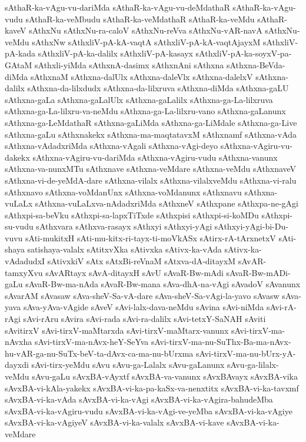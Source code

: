 {sAthaR-ka-vAgu-vu-dariMda
sAthaR-ka-vAgu-vu-deMdathaR
sAthaR-ka-vAgu-vudu
sAthaR-ka-veMbudu
sAthaR-ka-veMdathaR
sAthaR-ka-veMdu
sAthaR-kaveV
sAthxNu
sAthxNu-ra-caloV
sAthxNu-reVva
sAthxNu-vAR-navA
sAthxNu-veMdu
sAthxNw
sAthxliV-pA-kA-vaqtA
sAthxliV-pA-kA-vaqtAjayxM
sAthxliV-pA-kada
sAthxliV-pA-ka-dalilx
sAthxliV-pA-kasayx
sAthxliV-pA-ka-soyxV-pa-GAtaM
sAthxli-yiMda
sAthxnA-dasimx
sAthxnAni
sAthxna
sAthxna-BeVda-diMda
sAthxnaM
sAthxna-dalUlx
sAthxna-daleVlx
sAthxna-dalelxV
sAthxna-dalilx
sAthxna-da-lilxdudx
sAthxna-da-lilxruva
sAthxna-diMda
sAthxna-gaLU
sAthxna-gaLa
sAthxna-gaLalUlx
sAthxna-gaLalilx
sAthxna-ga-La-lilxruva
sAthxna-ga-La-lilxru-va-neMdu
sAthxna-ga-La-lilxru-vano
sAthxna-gaLanunx
sAthxna-ga-LeMdathaR
sAthxna-gaLiMda
sAthxna-ga-LiMdale
sAthxna-ga-Live
sAthxna-gaLu
sAthxnakekx
sAthxna-ma-maqtatavxM
sAthxnamf
sAthxna-vAda
sAthxna-vAdadxriMda
sAthxna-vAgali
sAthxna-vAgi-deyo
sAthxna-vAgiru-vu-dakekx
sAthxna-vAgiru-vu-dariMda
sAthxna-vAgiru-vudu
sAthxna-vanunx
sAthxna-va-nunxMTu
sAthxnave
sAthxna-veMdare
sAthxna-veMdu
sAthxnaveV
sAthxna-vi-de-yeMdA-dare
sAthxna-vilalx
sAthxna-vilalxveMdu
sAthxna-vi-ralu
sAthxnavo
sAthxna-voMdanUnx
sAthxna-voMdanunx
sAthxnavu
sAthxna-vuLaLx
sAthxna-vuLaLxva-nAdadxriMda
sAthxneV
sAthxpane
sAthxpa-ne-gAgi
sAthxpi-sa-beVku
sAthxpi-sa-lapxTiTxde
sAthxpisi
sAthxpi-si-koMDu
sAthxpi-su-vudu
sAthxvara
sAthxva-rasayx
sAthxyi
sAthxyi-yAgi
sAthxyi-yAgi-bi-Du-vuvu
sAti-mukitxH
sAti-mu-kitx-ri-tayx-ti-moVkASx
sAtirx-rA-tArxnetxV
sAti-shaya
satishaya-valalx
sAtitxvXka
sAtivxka
sAtivx-ka-vAda
sAtivx-ka-vAdadudxI
sAtivxkiV
sAtx
sAtxBi-reVnaM
sAtxva-dA-ditayxM
sAvAR-tamxyXvu
sAvARtayx
sAvA-ditayxH
sAvU
sAvaR-Bw-mAdi
sAvaR-Bw-mADi-gaLu
sAvaR-Bw-ma-nAda
sAvaR-Bw-mana
sAva-dhA-na-vAgi
sAvadoV
sAvanunx
sAvarAM
sAvasaw
sAva-sheV-Sa-vA-dare
sAva-sheV-Sa-vAgi-la-yavo
sAvasw
sAva-yava
sAva-yAva-vAgide
sAveV
sAvi-lalx-dava-neMdu
sAvina
sAvi-niMda
sAvi-rA-rAgi
sAvi-rAru
sAvira
sAvi-rada
sAvi-ra-dalilx
sAvi-tetxY-SaNAH
sAviti
sAvitirxV
sAvi-tirxV-maMtarxda
sAvi-tirxV-maMtarx-vanunx
sAvi-tirxV-ma-nAvxha
sAvi-tirxV-ma-nAvx-heY-SeYva
sAvi-tirxV-ma-nu-SuThx-Ba-ma-nAvx-hu-vAR-ga-nu-SuTx-beV-ta-dAvx-ca-ma-nu-bUrxma
sAvi-tirxV-ma-nu-bUrx-yA-dayxdi
sAvi-tirx-yeMdu
sAvu
sAvu-ga-Lalalx
sAvu-gaLanunx
sAvu-ga-lilalx-veMdu
sAvu-gaLu
sAvxBA-vAyxtf
sAvxBA-va-vanunx
sAvxBAvayx
sAvxBA-vika
sAvxBA-vi-kAla-yakekx
sAvxBA-vi-ka-pa-kaSx-va-nenxtitx
sAvxBA-vi-ka-tavxmf
sAvxBA-vi-ka-vAda
sAvxBA-vi-ka-vAgi
sAvxBA-vi-ka-vAgira-bahudeMba
sAvxBA-vi-ka-vAgiru-vudu
sAvxBA-vi-ka-vAgi-ve-yeMba
sAvxBA-vi-ka-vAgiye
sAvxBA-vi-ka-vAgiyeV
sAvxBA-vi-ka-valalx
sAvxBA-vi-kave
sAvxBA-vi-ka-veMdare
}
